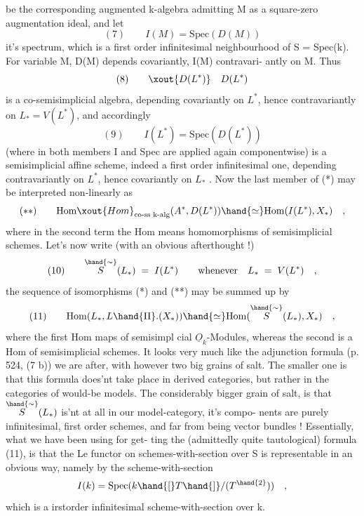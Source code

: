 
be the corresponding augmented k-algebra admitting M as a square-zero
augmentation ideal,  and let
\[ (7) \qquad I(M) = \mathrm{Spec}(D(M)) \]
it's spectrum,  which is a first order infinitesimal neighbourhood of
S = Spec(k).  For variable M,  D(M) depends covariantly, I(M) contravari-%
antly on M.  Thus
\[ (8) \qquad \xout{D(L^*)} \quad D(L^*) \]
is a co-semisimplicial algebra,  depending covariantly on $L^*$,  hence
contravariantly on $L_* = V(L^*)$,  and accordingly
\[ (9) \qquad I(L^*) = \mathrm{Spec}(D(L^*)) \]
(where in both members I and Spec are applied again componentwise) is
a semisimplicial affine scheme,  indeed a first order infinitesimal one,
depending contravariantly on $L^*$,  hence covariantly on $L_*$ .  Now the
last member of (*)  may be interpreted  non-linearly as
\[ (**) \qquad \mathrm{Hom}\xout{Hom}_{\text{co-ss k-alg}}(A^*,D(L^*)) \hand{\simeq} \mathrm{Hom}(I(L^*), X_*) \quad , \]
where in the second term the Hom means homomorphisms of semisimplicial
schemes.  Let's now write (with an obvious afterthought !)
\[ (10) \qquad \overset{\hand{\sim}}{S}(L_*) \;=\; I(L^*) \qquad \text{whenever} \quad L_* \;=\; V(L^*) \quad , \]
the sequence of isomorphisms (*) and (**) may be summed up by
\[ (11) \qquad \mathrm{Hom}(L_*,L\hand{\Pi}.(X_*)) \hand{\simeq} \mathrm{Hom}(\overset{\hand{\sim}}{S}(L_*), X_*) \quad , \]
where the first Hom    maps of semisimpl%
\hand{-}cial $\underline{O}_k$-Modules,  whereas the second is a Hom of semisimplicial schemes.
It looks very much like the adjunction formula (p. 524,  (7 b)) we are
after,  with however two big grains of salt.  The smaller one is that
this formula does'nt take place in derived categories,  but rather in
the categories of would-be models.  The considerably bigger grain of
salt,  is that  $\overset{\hand{\sim}}{S}(L_*)$  is'nt at all in our model-category,  it's compo-%
nents are purely infinitesimal,  first order schemes,  and far from
being vector bundles !  Essentially,  what we have been using for get-%
ting the (admittedly quite tautological)   formula (11),  is
that the Le functor on schemes-with-section  over S is representable
in an obvious way,  namely by the scheme-with-section
\[ I(k) = \mathrm{Spec}(k\hand{[}T\hand{]}/(T^{\hand{2}})) \quad , \]
which is a irst\unsure{\hand{-}}order infinitesimal scheme-with-section over k.


